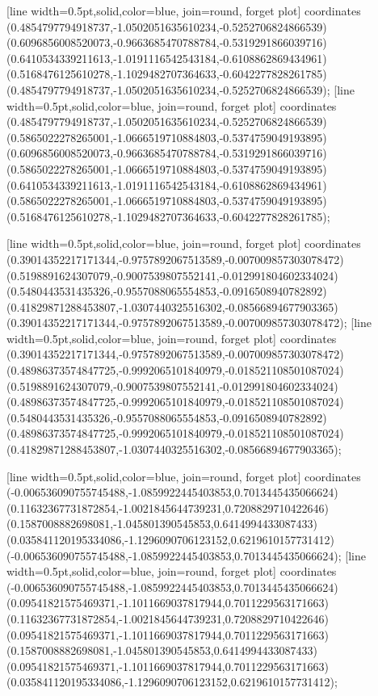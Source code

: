 [line width=0.5pt,solid,color=blue, join=round, forget plot] coordinates {(0.4854797794918737,-1.0502051635610234,-0.5252706824866539) (0.6096856008520073,-0.9663685470788784,-0.5319291866039716) (0.6410534339211613,-1.0191116542543184,-0.6108862869434961) (0.5168476125610278,-1.1029482707364633,-0.6042277828261785) (0.4854797794918737,-1.0502051635610234,-0.5252706824866539)};
[line width=0.5pt,solid,color=blue, join=round, forget plot] coordinates {(0.4854797794918737,-1.0502051635610234,-0.5252706824866539) (0.5865022278265001,-1.0666519710884803,-0.5374759049193895) (0.6096856008520073,-0.9663685470788784,-0.5319291866039716) (0.5865022278265001,-1.0666519710884803,-0.5374759049193895) (0.6410534339211613,-1.0191116542543184,-0.6108862869434961) (0.5865022278265001,-1.0666519710884803,-0.5374759049193895) (0.5168476125610278,-1.1029482707364633,-0.6042277828261785)};

[line width=0.5pt,solid,color=blue, join=round, forget plot] coordinates {(0.39014352217171344,-0.9757892067513589,-0.007009857303078472) (0.5198891624307079,-0.9007539807552141,-0.012991804602334024) (0.5480443531435326,-0.9557088065554853,-0.0916508940782892) (0.41829871288453807,-1.0307440325516302,-0.08566894677903365) (0.39014352217171344,-0.9757892067513589,-0.007009857303078472)};
[line width=0.5pt,solid,color=blue, join=round, forget plot] coordinates {(0.39014352217171344,-0.9757892067513589,-0.007009857303078472) (0.48986373574847725,-0.9992065101840979,-0.018521108501087024) (0.5198891624307079,-0.9007539807552141,-0.012991804602334024) (0.48986373574847725,-0.9992065101840979,-0.018521108501087024) (0.5480443531435326,-0.9557088065554853,-0.0916508940782892) (0.48986373574847725,-0.9992065101840979,-0.018521108501087024) (0.41829871288453807,-1.0307440325516302,-0.08566894677903365)};

[line width=0.5pt,solid,color=blue, join=round, forget plot] coordinates {(-0.006536090755745488,-1.0859922445403853,0.7013445435066624) (0.11632367731872854,-1.0021845644739231,0.7208829710422646) (0.1587008882698081,-1.045801390545853,0.6414994433087433) (0.035841120195334086,-1.1296090706123152,0.6219610157731412) (-0.006536090755745488,-1.0859922445403853,0.7013445435066624)};
[line width=0.5pt,solid,color=blue, join=round, forget plot] coordinates {(-0.006536090755745488,-1.0859922445403853,0.7013445435066624) (0.09541821575469371,-1.1011669037817944,0.7011229563171663) (0.11632367731872854,-1.0021845644739231,0.7208829710422646) (0.09541821575469371,-1.1011669037817944,0.7011229563171663) (0.1587008882698081,-1.045801390545853,0.6414994433087433) (0.09541821575469371,-1.1011669037817944,0.7011229563171663) (0.035841120195334086,-1.1296090706123152,0.6219610157731412)};

